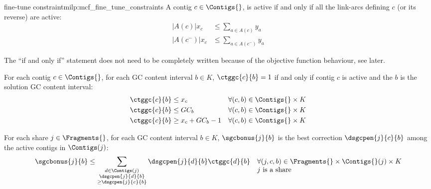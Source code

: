 \begin{definition}{\MCF{} fine-tune constraint}{milp:mcf_fine_tune_constraints}
    A contig \(c \in \Contigs{}\), is active if and only if all the link-arcs defining \(c\) (or its reverse) are active:
    \begin{align}
      |A(c)|x_c & \leq \sum_{a \in A(c)} y_a \\
      |A(c^-)|x_c & \leq \sum_{a \in A(c^-)} y_a
    \end{align}
    
    \begin{notebox}
      The \enquote{if and only if} statement does not need to be completely written because of the objective function behaviour, see later.
    \end{notebox}

    For each contig \(c \in \Contigs{}\), for each GC content interval \(b \in K\), \(\ctggc{c}{b} = 1\) if and only if contig \(c\) is active and the \(b\) is the solution GC content interval:
    \begin{align}
        \ctggc{c}{b} & \leq x_c & \forall (c, b) \in \Contigs{} \times K \\
        \ctggc{c}{b} & \leq GC_b & \forall (c, b) \in \Contigs{} \times K \\
        \ctggc{c}{b} & \geq x_c + GC_b - 1 & \forall (c, b) \in \Contigs{} \times K
    \end{align}

    For each share \(j \in \Fragments{}\), for each GC content interval \(b \in K\), \(\sgcbonus{j}{b}\) is the best correction \(\dsgcpen{j}{c}{b}\) among the active contigs in \(\Contigs(j)\):
    \begin{equation}
        \sgcbonus{j}{b} \leq \sum_{\substack{
            d \in \Contigs(j) \\ \dsgcpen{j}{d}{b} \\ \geq \dsgcpen{j}{c}{b}
        }} \dsgcpen{j}{d}{b} \ctggc{d}{b} \quad \begin{array}[t]{@{}l@{}}
            \forall (j, c, b) \in \Fragments{} \times \Contigs{}(j) \times K \\ 
            j \text{ is a share}
        \end{array}
    \end{equation}
    
\end{definition}



